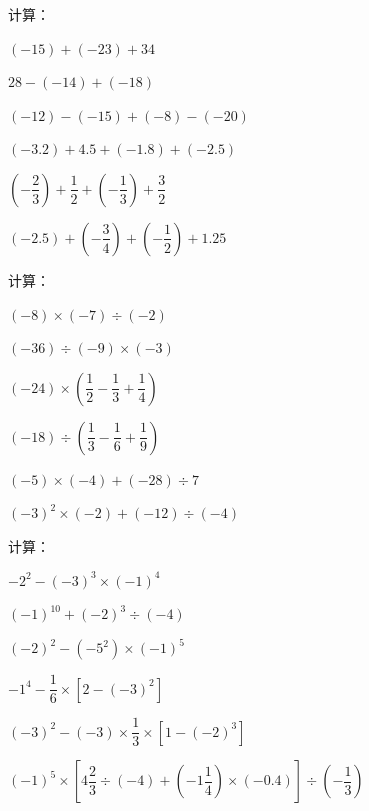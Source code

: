 \documentclass[a4paper,12pt]{ctexart}
\begin{document}
\begin{exercise}
\item 计算：
  \begin{subexercise}
    \item $(-15)+(-23)+34$
    \item $28-(-14)+(-18)$
    \item $(-12)-(-15)+(-8)-(-20)$
    \item $(-3.2)+4.5+(-1.8)+(-2.5)$
    \item $\left(-\dfrac{2}{3}\right)+\dfrac{1}{2}+\left(-\dfrac{1}{3}\right)+\dfrac{3}{2}$
    \item $(-2.5)+\left(-\dfrac{3}{4}\right)+\left(-\dfrac{1}{2}\right)+1.25$
  \end{subexercise}

\item 计算：
  \begin{subexercise}
    \item $(-8)\times(-7)\div(-2)$
    \item $(-36)\div(-9)\times(-3)$
    \item $(-24)\times\left(\dfrac{1}{2}-\dfrac{1}{3}+\dfrac{1}{4}\right)$
    \item $(-18)\div\left(\dfrac{1}{3}-\dfrac{1}{6}+\dfrac{1}{9}\right)$
    \item $(-5)\times(-4)+(-28)\div7$
    \item $(-3)^2\times(-2)+(-12)\div(-4)$
  \end{subexercise}

\item 计算：
  \begin{subexercise}
    \item $-2^2-(-3)^3\times(-1)^4$
    \item $(-1)^{10}+(-2)^3\div(-4)$
    \item $(-2)^2-(-5^2)\times(-1)^5$
    \item $-1^4-\dfrac{1}{6}\times[2-(-3)^2]$
    \item $(-3)^2-(-3)\times\dfrac{1}{3}\times\left[1-(-2)^3\right]$
    \item $(-1)^5\times\left[4\dfrac{2}{3}\div(-4)+(-1\dfrac{1}{4})\times(-0.4)\right]\div\left(-\dfrac{1}{3}\right)$
  \end{subexercise}
\end{exercise}

\newpage


\end{document}
